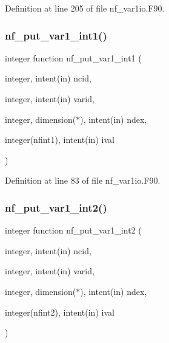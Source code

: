 Definition at line 205 of file nf\+\_\+var1io.\+F90.

\mbox{\label{nf__var1io_8F90_a69f0bec37e3970b10e72933863985359}} 
\subsubsection{\texorpdfstring{nf\+\_\+put\+\_\+var1\+\_\+int1()}{nf\_put\_var1\_int1()}}
{\footnotesize\ttfamily integer function nf\+\_\+put\+\_\+var1\+\_\+int1 (\begin{DoxyParamCaption}\item[{integer, intent(in)}]{ncid,  }\item[{integer, intent(in)}]{varid,  }\item[{integer, dimension($\ast$), intent(in)}]{ndex,  }\item[{integer(nfint1), intent(in)}]{ival }\end{DoxyParamCaption})}



Definition at line 83 of file nf\+\_\+var1io.\+F90.

\mbox{\label{nf__var1io_8F90_a06f89d6209e9922c1141482e2777b04c}} 
\subsubsection{\texorpdfstring{nf\+\_\+put\+\_\+var1\+\_\+int2()}{nf\_put\_var1\_int2()}}
{\footnotesize\ttfamily integer function nf\+\_\+put\+\_\+var1\+\_\+int2 (\begin{DoxyParamCaption}\item[{integer, intent(in)}]{ncid,  }\item[{integer, intent(in)}]{varid,  }\item[{integer, dimension($\ast$), intent(in)}]{ndex,  }\item[{integer(nfint2), intent(in)}]{ival }\end{DoxyParamCaption})}



